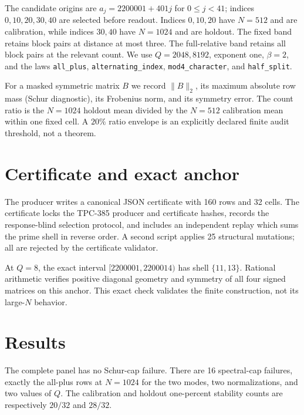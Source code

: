 \documentclass[10pt]{article}
\begin{document}
The candidate origins are $a_j=2200001+401j$ for $0\leq j<41$; indices
$0,10,20,30,40$ are selected before readout.  Indices $0,10,20$ have
$N=512$ and are calibration, while indices $30,40$ have $N=1024$ and are
holdout.  The fixed band retains block pairs at distance at most three.  The
full-relative band retains all block pairs at the relevant count.  We use
$Q=2048,8192$, exponent one, $\beta=2$, and the laws
\texttt{all\_plus}, \texttt{alternating\_index},
\texttt{mod4\_character}, and \texttt{half\_split}.

For a masked symmetric matrix $B$ we record $\|B\|_2$, its maximum absolute
row mass (Schur diagnostic), its Frobenius norm, and its symmetry error.  The
count ratio is the $N=1024$ holdout mean divided by the $N=512$ calibration
mean within one fixed cell.  A $20\%$ ratio envelope is an explicitly
declared finite audit threshold, not a theorem.

\section{Certificate and exact anchor}

The producer writes a canonical JSON certificate with 160 rows and 32 cells.
The certificate locks the TPC-385 producer and certificate hashes, records
the response-blind selection protocol, and includes an independent replay
which sums the prime shell in reverse order.  A second script applies 25
structural mutations; all are rejected by the certificate validator.

At $Q=8$, the exact interval $[2200001,2200014)$ has shell $\{11,13\}$.
Rational arithmetic verifies positive diagonal geometry and symmetry of all
four signed matrices on this anchor.  This exact check validates the finite
construction, not its large-$N$ behavior.

\section{Results}

The complete panel has no Schur-cap failure.  There are 16 spectral-cap
failures, exactly the all-plus rows at $N=1024$ for the two modes, two
normalizations, and two values of $Q$.  The calibration and holdout
one-percent stability counts are respectively $20/32$ and $28/32$.
\end{document}

